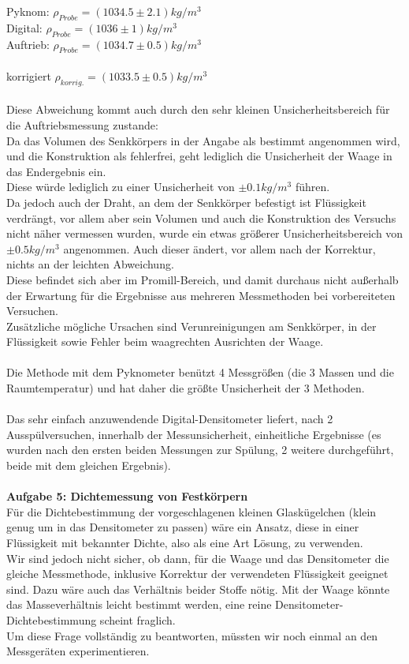 \documentclass[12pt,a4paper]{article}
\begin{document}
\begin{multicols}{2}
\noindent Pyknom: $\rho_{Probe} = (1034.5 \pm 2.1) kg/m^3$\\
Digital:   $\rho_{Probe}=   (1036 \pm 1) kg/m^3$\\
Auftrieb: $\rho_{Probe} = (1034.7 \pm 0.5)kg/m^3$\\
\\
korrigiert $\rho_{korrig.} = (1033.5 \pm 0.5)kg/m^3$\\
\\
Diese Abweichung kommt auch durch den sehr kleinen Unsicherheitsbereich für die Auftriebsmessung zustande:\\
Da das Volumen des Senkkörpers in der Angabe als bestimmt angenommen wird, und die Konstruktion als fehlerfrei, geht lediglich die Unsicherheit der Waage in das Endergebnis ein.\\
Diese würde lediglich zu einer Unsicherheit von $\pm 0.1 kg/m^3$ führen.\\
Da jedoch auch der Draht, an dem der Senkkörper befestigt ist Flüssigkeit verdrängt, vor allem aber sein Volumen und auch die Konstruktion des Versuchs nicht näher vermessen wurden, wurde ein etwas größerer Unsicherheitsbereich von $\pm 0.5 kg/m^3$ angenommen. Auch dieser ändert, vor allem nach der Korrektur, nichts an der leichten Abweichung.\\
Diese befindet sich aber im Promill-Bereich, und damit durchaus nicht außerhalb der Erwartung für die Ergebnisse aus mehreren Messmethoden bei vorbereiteten Versuchen.\\
Zusätzliche mögliche Ursachen sind Verunreinigungen am Senkkörper, in der Flüssigkeit sowie Fehler beim waagrechten Ausrichten der Waage.\\
\\
Die Methode mit dem Pyknometer benützt 4 Messgrößen (die 3 Massen und die Raumtemperatur) und hat daher die größte Unsicherheit der 3 Methoden.\\
\\
Das sehr einfach anzuwendende Digital-Densitometer liefert, nach 2 Ausspülversuchen, innerhalb der Messunsicherheit, einheitliche Ergebnisse (es wurden nach den ersten beiden Messungen zur Spülung, 2 weitere durchgeführt, beide mit dem gleichen Ergebnis).\\
\\
\textbf{Aufgabe 5: Dichtemessung von Festkörpern}\\
Für die Dichtebestimmung der vorgeschlagenen kleinen Glaskügelchen (klein genug um in das Densitometer zu passen) wäre ein Ansatz, diese in einer Flüssigkeit mit bekannter Dichte, also als eine Art Lösung, zu verwenden.\\
Wir sind jedoch nicht sicher, ob dann, für die Waage und das Densitometer die gleiche Messmethode, inklusive Korrektur der verwendeten Flüssigkeit geeignet sind. Dazu wäre auch das Verhältnis beider Stoffe nötig. Mit der Waage könnte das Masseverhältnis leicht bestimmt werden, eine reine Densitometer-Dichtebestimmung scheint fraglich.\\
Um diese Frage vollständig zu beantworten, müssten wir noch einmal an den Messgeräten experimentieren.


\end{multicols}
\end{document}
